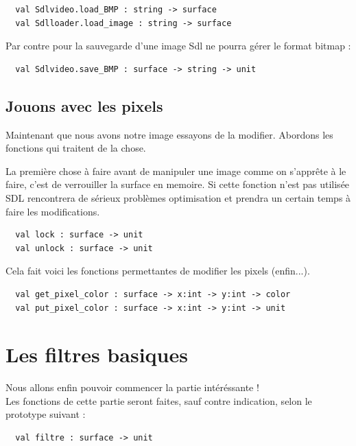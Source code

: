 \documentclass[a4paper]{article}
\begin{document}
\begin{verbatim}
  val Sdlvideo.load_BMP : string -> surface
  val Sdlloader.load_image : string -> surface
\end{verbatim}

\noindent
Par contre pour la sauvegarde d'une image Sdl ne pourra gérer le format bitmap :

\begin{verbatim}
  val Sdlvideo.save_BMP : surface -> string -> unit
\end{verbatim}

\subsection{Jouons avec les pixels}

Maintenant que nous avons notre image essayons de la modifier. Abordons les fonctions qui traitent de la chose.\par\bigskip

La première chose à faire avant de manipuler une image comme on s'apprête à le faire, c'est de verrouiller la surface en memoire. Si cette fonction n'est pas utilisée SDL rencontrera de sérieux problèmes optimisation et prendra un certain temps à faire les modifications.

\begin{verbatim}
  val lock : surface -> unit
  val unlock : surface -> unit
\end{verbatim}

\noindent
Cela fait voici les fonctions permettantes de modifier les pixels (enfin...).

\begin{verbatim}
  val get_pixel_color : surface -> x:int -> y:int -> color
  val put_pixel_color : surface -> x:int -> y:int -> unit
\end{verbatim}

\section{Les filtres basiques}

Nous allons enfin pouvoir commencer la partie intéréssante !\\
Les fonctions de cette partie seront faites, sauf contre indication, selon le prototype suivant :

\begin{verbatim}
  val filtre : surface -> unit
\end{verbatim}
\end{document}
